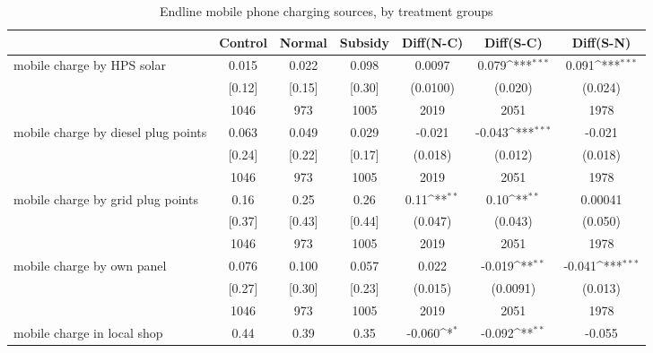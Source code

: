 \begin{table}[htbp]\centering
\def\sym#1{\ifmmode^{#1}\else\(^{#1}\)\fi}
\caption{Endline mobile phone charging sources, by treatment groups \label{tab:"balance"}}
\begin{tabular*}{1\hsize}{@{\hskip\tabcolsep\extracolsep\fill}l*{1}{cccccc}}
\toprule
                                &  Control&   Normal&  Subsidy&Diff(N-C)         &Diff(S-C)         &Diff(S-N)         \\
\midrule
mobile charge by HPS solar      &    0.015&    0.022&    0.098&   0.0097         &    0.079\sym{***}&    0.091\sym{***}\\
                                &   [0.12]&   [0.15]&   [0.30]& (0.0100)         &  (0.020)         &  (0.024)         \\
                                &     1046&      973&     1005&     2019         &     2051         &     1978         \\
mobile charge by diesel  plug points&    0.063&    0.049&    0.029&   -0.021         &   -0.043\sym{***}&   -0.021         \\
                                &   [0.24]&   [0.22]&   [0.17]&  (0.018)         &  (0.012)         &  (0.018)         \\
                                &     1046&      973&     1005&     2019         &     2051         &     1978         \\
mobile charge by grid plug points&     0.16&     0.25&     0.26&     0.11\sym{**} &     0.10\sym{**} &  0.00041         \\
                                &   [0.37]&   [0.43]&   [0.44]&  (0.047)         &  (0.043)         &  (0.050)         \\
                                &     1046&      973&     1005&     2019         &     2051         &     1978         \\
mobile charge by own panel      &    0.076&    0.100&    0.057&    0.022         &   -0.019\sym{**} &   -0.041\sym{***}\\
                                &   [0.27]&   [0.30]&   [0.23]&  (0.015)         & (0.0091)         &  (0.013)         \\
                                &     1046&      973&     1005&     2019         &     2051         &     1978         \\
mobile charge in local shop     &     0.44&     0.39&     0.35&   -0.060\sym{*}  &   -0.092\sym{**} &   -0.055         \\

\end{tabular*}
\end{table}
